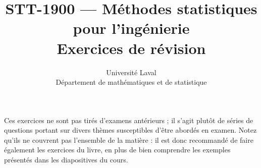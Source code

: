 \documentclass[11pt]{article}
\title{\textbf{STT-1900 --- Méthodes statistiques pour l'ingénierie}\\[6pt]
Exercices de révision}
\author{Université Laval\\Département de mathématiques et de statistique}
\date{}
\begin{document}
\maketitle
Ces exercices ne sont pas tirés d'examens antérieurs ; il s'agit plutôt de séries de questions portant sur divers thèmes susceptibles d'être abordés en examen. Notez qu'ils ne couvrent pas l'ensemble de la matière : il est donc recommandé de faire également les exercices du livre, en plus de bien comprendre les exemples présentés dans les diapositives du cours.


\end{document}
